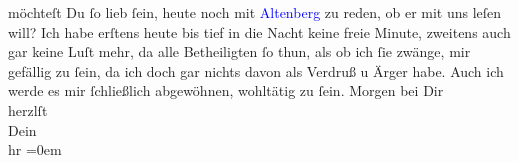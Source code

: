                möchteſt Du ſo lieb ſein, heute noch mit \textcolor{blue}{Altenberg}{}\ledrightnote{\textcolor{blue}{Peter Altenberg}}
               zu reden, ob er mit uns leſen will? Ich habe erſtens heute bis tief in die Nacht
               keine freie Minute, {\pb}zweitens auch gar keine Luſt
               mehr, da alle Betheiligten ſo thun, als ob ich ſie zwänge, mir gefällig zu ſein, da
               ich doch gar nichts davon als Verdruß u Ärger habe. Auch ich werde es mir ſchließlich
               abgewöhnen, wohltätig zu ſein.\pend
           \pstart
           Morgen bei Dir{\\[\baselineskip]}herzlſt{\\[\baselineskip]}Dein{\\[\baselineskip]}\spacefill\mbox{hr}\pend
           \leftskip=0em{}\pstart
           \textcolor{gray}{\textbf{\label{T_L00659_1v}\label{T_L00659_1h}}}\pend
           \endnumbering{}  
      
